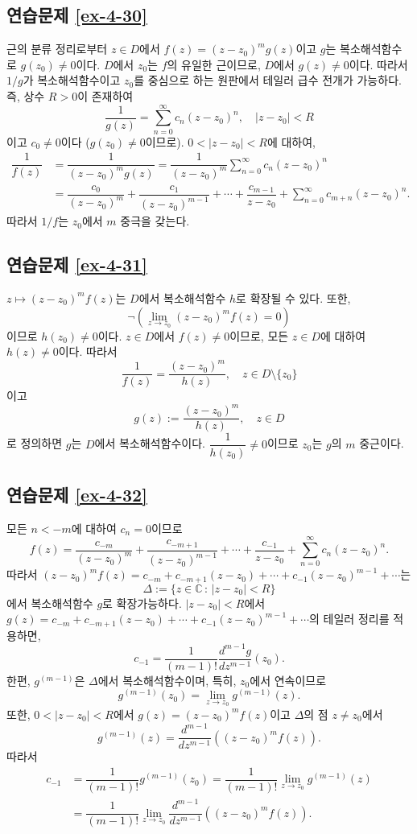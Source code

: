 \subsection*{연습문제 \ref{ex-4-30}}

근의 분류 정리로부터 $z\in D$에서
$f(z) = (z-z_0)^mg(z)$이고 $g$는 복소해석함수로 $g(z_0)\ne0$이다.
$D$에서 $z_0$는 $f$의 유일한 근이므로, $D$에서 $g(z)\ne0$이다.
따라서 $1/g$가 복소해석함수이고 $z_0$를 중심으로 하는 원판에서 테일러 급수 전개가 가능하다.
즉, 상수 $R>0$이 존재하여
\[
\dfrac1{g(z)} = \sum_{n=0}^\infty c_n(z-z_0)^n,
\quad |z-z_0|<R
\]
이고 $c_0\ne0$이다 ($g(z_0)\ne0$이므로). 
$0<|z-z_0|<R$에 대하여,
\begin{align*}
\dfrac1{f(z)} 
&= \dfrac1{(z-z_0)^m g(z)} = \dfrac1{(z-z_0)^m} \sum_{n=0}^\infty c_n(z-z_0)^n \\
&= \dfrac{c_0}{(z-z_0)^m} +  \dfrac{c_1}{(z-z_0)^{m-1}} + \cdots 
+  \dfrac{c_{m-1}}{z-z_0} + \sum_{n=0}^\infty c_{m+n} (z-z_0)^n.
\end{align*}
따라서 $1/f$는 $z_0$에서 $m$ 중극을 갖는다.

\subsection*{연습문제 \ref{ex-4-31}}

$z\mapsto (z-z_0)^m f(z)$는 $D$에서 복소해석함수 $h$로 확장될 수 있다.
또한, 
\[
\neg\left( \lim_{z\to z_0} (z-z_0)^m f(z) = 0 \right)
\]
이므로 $h(z_0) \ne 0$이다. 
$z\in D$에서 $f(z)\ne0$이므로, 모든 $z\in D$에 대하여 $h(z)\ne0$이다.
따라서
\[
\dfrac1{f(z)} = \dfrac{(z-z_0)^m}{h(z)},
\quad z\in D\setminus \{z_0\}
\]
이고 
\[
g(z):= \dfrac{(z-z_0)^m}{h(z)},
\quad z\in D
\]
로 정의하면 $g$는 $D$에서 복소해석함수이다.
$\dfrac1{h(z_0)}\ne0$이므로 $z_0$는 $g$의 $m$ 중근이다.

\subsection*{연습문제 \ref{ex-4-32}}

모든 $n<-m$에 대하여 $c_n=0$이므로
\[
f(z) = \dfrac{c_{-m}}{(z-z_0)^m} + \dfrac{c_{-m+1}}{(z-z_0)^{m-1}}
+ \cdots + \dfrac{c_{-1}}{z-z_0} + \sum_{n=0}^\infty c_n(z-z_0)^n.
\]
따라서 $(z-z_0)^m f(z) = c_{-m} + c_{-m+1}(z-z_0) + \cdots + c_{-1}(z-z_0)^{m-1} + \cdots$는
\[
\Delta:= \{ z\in \mathbb C \,:\, |z-z_0|<R\}
\]
에서 복소해석함수 $g$로 확장가능하다.
$|z-z_0| <R$에서 
$g(z) = c_{-m} + c_{-m+1}(z-z_0) + \cdots + c_{-1}(z-z_0)^{m-1} + \cdots$의
테일러 정리를 적용하면,
\[
c_{-1} = \dfrac1{(m-1)!}\dfrac{d^{m-1}g}{dz^{m-1}}(z_0).
\]
한편, $g^{(m-1)}$은 $\Delta$에서 복소해석함수이며,
특히, $z_0$에서 연속이므로
\[
g^{(m-1)}(z_0) = \lim_{z\to z_0} g^{(m-1)}(z).
\]
또한, $0<|z-z_0|<R$에서 $g(z) = (z-z_0)^m f(z)$이고
$\Delta$의 점 $z\ne z_0$에서
\[
g^{(m-1)}(z) = \dfrac{d^{m-1}}{dz^{m-1}}((z-z_0)^m f(z)).
\]
따라서
\begin{align*}
c_{-1} &= \dfrac1{(m-1)!} g^{(m-1)}(z_0) 
= \dfrac1{(m-1)!} \lim_{z\to z_0} g^{(m-1)}(z) \\
&= \dfrac1{(m-1)!} \lim_{z\to z_0} \dfrac{d^{m-1}}{dz^{m-1}}((z-z_0)^m f(z)).
\end{align*}

